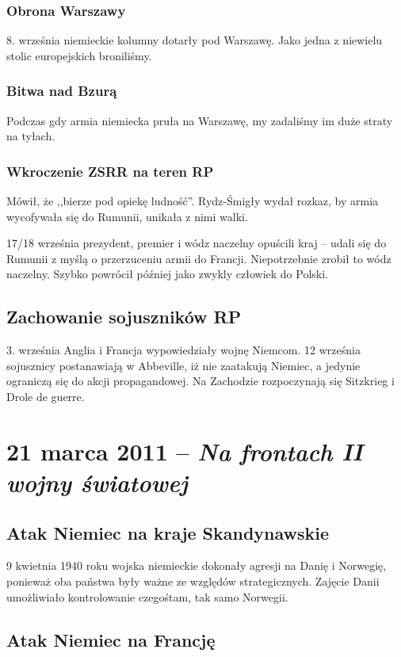 \documentclass [a4paper, 11pt, oneside]{book}
\begin{document}
\subsection{Obrona Warszawy}
8. września niemieckie kolumny dotarły pod Warszawę. Jako jedna z niewielu stolic europejskich broniliśmy.

\subsection{Bitwa nad Bzurą}
Podczas gdy armia niemiecka pruła na Warszawę, my zadaliśmy im duże straty na tyłach.

\subsection{Wkroczenie ZSRR na teren RP}
Mówił, że ,,bierze pod opiekę ludność''. Rydz-Śmigły wydał rozkaz, by armia wycofywała się do Rumunii, unikała z nimi walki.

17/18 września prezydent, premier i wódz naczelny opuścili kraj -- udali się do Rumunii z myślą o przerzuceniu armii do Francji. Niepotrzebnie zrobił to wódz naczelny. Szybko powrócił później jako zwykly człowiek do Polski.

\section{Zachowanie sojuszników RP}
3. września Anglia i Francja wypowiedziały wojnę Niemcom. 12 września sojusznicy postanawiają w Abbeville, iż nie zaatakują Niemiec, a jedynie ograniczą się do akcji propagandowej. Na Zachodzie rozpoczynają się Sitzkrieg i Drole de guerre.

\chapter{21 marca 2011 -- \textit{Na frontach II wojny światowej}}

\section{Atak Niemiec na kraje Skandynawskie}

9 kwietnia 1940 roku wojska niemieckie dokonały agresji na Danię i Norwegię, ponieważ oba państwa były ważne ze względów strategicznych. Zajęcie Danii umożliwiało kontrolowanie czegośtam, tak samo Norwegii.

\section{Atak Niemiec na Francję}
\end{document}
